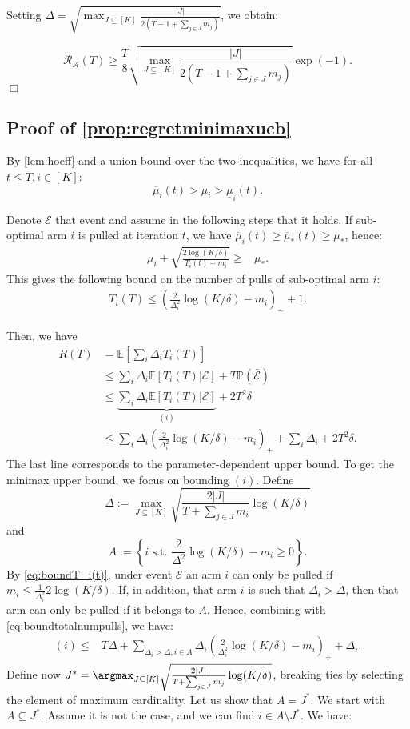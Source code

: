 Setting $\Delta= \sqrt{\max_{J\subseteq [K]} \frac{|J|}{2(T-1+\sum_{j \in J} m_j)}}$, we obtain:

\[
\mathcal{R}_\mathcal{A}(T)\geq \frac{T}{8}\sqrt{\max_{J\subseteq [K]} \frac{|J|}{2(T-1+\sum_{j \in J} m_j)}}\exp\left(-1\right).
\]
\hfill \(\Box\)

\subsection{Proof of \cref{prop:regretminimaxucb}}

 
 By \cref{lem:hoeff} and a union bound over the two inequalities, we have for all $t\leq T, i \in [K]$:
\[
\overline{\mu}_i(t)>\mu_i>\underline{\mu}_i(t).
\]

Denote $\mathcal{E}$ that event and assume in the following steps that it holds. If sub-optimal arm $i$ is pulled at iteration $t$, we have $\overline{\mu}_i(t)\geq \overline{\mu}_*(t)\geq \mu_*$, hence:
\begin{align}\label{eq:boundT_i(t)}
 \mu_i+\sqrt{\frac{2\log(K/\delta)}{T_i(t)+m_i}} \geq& \mu_*.
\end{align}
This gives the following bound on the number of pulls of sub-optimal arm $i$:
\begin{align}\label{eq:boundtotalnumpulls}
T_i(T) \leq \left( \frac{2}{\Delta_i^2} \log(K/\delta)-m_i\right)_++1.
\end{align}


Then, we have
\begin{align*}
    R(T)&=\mathbb{E}\left[\sum_i \Delta_i T_i(T)\right]\\
    &\leq \sum_i \Delta_i \mathbb{E}\left[T_i(T)|\mathcal{E}\right]+T\mathbb{P}\left(\bar{\mathcal{E}}\right)\\
    &\leq \underbrace{\sum_i \Delta_i \mathbb{E}\left[T_i(T)|\mathcal{E}\right]}_{(i)}+2T^2\delta\\
    &\leq\sum_i \Delta_i\left( \frac{2}{\Delta_i^2} \log(K/\delta)-m_i\right)_++\sum_i \Delta_i +2T^2\delta.
\end{align*}
The last line corresponds to the parameter-dependent upper bound. To get the minimax upper bound, we focus on bounding $(i)$. Define
\[
\Delta:= \max_{J\subseteq [K]}\sqrt{\frac{2|J|}{T+\sum_{j\in J}m_i}\log(K/\delta)}
\]
and 
\[
A:= \left\{ i \text{ s.t. }  \frac{2}{\Delta^2} \log(K/\delta)-m_i\geq 0\right\}.
\]
By \cref{eq:boundT_i(t)}, under event $\mathcal{E}$ an arm $i$ can only be pulled if $m_i \leq \frac{1}{\Delta_i^2}2\log(K/ \delta)$. If, in addition, that arm $i$ is such that $\Delta_i >\Delta$, then that arm can only be pulled if it belongs to ${A}$. Hence, combining with \cref{eq:boundtotalnumpulls}, we have:
\begin{align}\label{eq:interdeltai}
    (i)\leq& T\Delta+\sum_{\Delta_i>\Delta, i \in {A}}\Delta_i\left( \frac{2}{\Delta_i^2} \log(K/\delta)-m_i\right)_++\Delta_i.
\end{align}
Define now $J^*=\argmax_{J\subseteq [K]}\sqrt{\frac{2|J|}{T+\sum_{j\in J}m_j}\log(K/\delta)}$, breaking ties by selecting the element of maximum cardinality. Let us show that $A=J^*$. We start with $A\subseteq J^*$. Assume it is not the case, and we can find $i \in A \setminus J^*$. We have:

